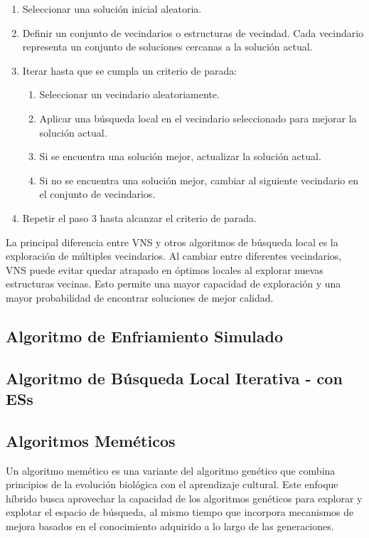 \begin{enumerate}
\item Seleccionar una solución inicial aleatoria.
\item Definir un conjunto de vecindarios o estructuras de vecindad. Cada vecindario representa un conjunto de soluciones cercanas a la solución actual.
\item Iterar hasta que se cumpla un criterio de parada:
\begin{enumerate}
	\item Seleccionar un vecindario aleatoriamente.
	\item  Aplicar una búsqueda local en el vecindario seleccionado para mejorar la solución actual.
	\item  Si se encuentra una solución mejor, actualizar la solución actual.
	\item  Si no se encuentra una solución mejor, cambiar al siguiente vecindario en el conjunto de vecindarios.
\end{enumerate}

\item Repetir el paso 3 hasta alcanzar el criterio de parada.
\end{enumerate}
La principal diferencia entre VNS y otros algoritmos de búsqueda local es la exploración de múltiples vecindarios. Al cambiar entre diferentes vecindarios, VNS puede evitar quedar atrapado en óptimos locales al explorar nuevas estructuras vecinas. Esto permite una mayor capacidad de exploración y una mayor probabilidad de encontrar soluciones de mejor calidad.\\

\subsection{Algoritmo de Enfriamiento Simulado}

\subsection{Algoritmo de Búsqueda Local Iterativa - con ESs}


\subsection{Algoritmos Meméticos}
Un algoritmo memético es una variante del algoritmo genético que combina principios de la evolución biológica con el aprendizaje cultural. Este enfoque híbrido busca aprovechar la capacidad de los algoritmos genéticos para explorar y explotar el espacio de búsqueda, al mismo tiempo que incorpora mecanismos de mejora basados en el conocimiento adquirido a lo largo de las generaciones. \\

